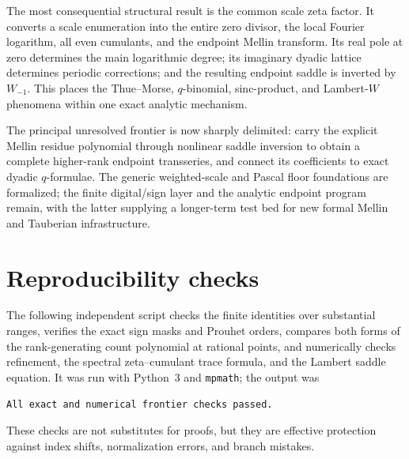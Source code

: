 \documentclass[11pt,a4paper]{article}
\theoremstyle{frontier}
\theoremstyle{definition}
\begin{document}
The most consequential structural result is the common scale zeta factor.  It converts a scale enumeration into the entire zero divisor, the local Fourier logarithm, all even cumulants, and the endpoint Mellin transform.  Its real pole at zero determines the main logarithmic degree; its imaginary dyadic lattice determines periodic corrections; and the resulting endpoint saddle is inverted by $W_{-1}$.  This places the Thue--Morse, $q$-binomial, sinc-product, and Lambert-$W$ phenomena within one exact analytic mechanism.

The principal unresolved frontier is now sharply delimited: carry the explicit Mellin residue polynomial through nonlinear saddle inversion to obtain a complete higher-rank endpoint transseries, and connect its coefficients to exact dyadic $q$-formulae.  The generic weighted-scale and Pascal floor foundations are formalized; the finite digital/sign layer and the analytic endpoint program remain, with the latter supplying a longer-term test bed for new formal Mellin and Tauberian infrastructure.


\appendix

\section{Reproducibility checks}\label{app:checks}

The following independent script checks the finite identities over substantial ranges, verifies the exact sign masks and Prouhet orders, compares both forms of the rank-generating count polynomial at rational points, and numerically checks refinement, the spectral zeta--cumulant trace formula, and the Lambert saddle equation.  It was run with Python~3 and \texttt{mpmath}; the output was
\begin{center}
\texttt{All exact and numerical frontier checks passed.}
\end{center}
These checks are not substitutes for proofs, but they are effective protection against index shifts, normalization errors, and branch mistakes.
\end{document}
